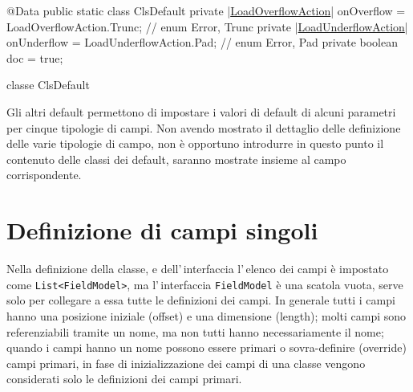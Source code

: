 \documentclass[a4paper,10pt]{report}
\newif\ifesource
\newenvironment{elisting}[1][H]
  {\captionsetup{aboveskip=0pt}\begin{listing}[#1]}
  {\end{listing}%
}
\begin{document}
\ifesource
\begin{figure*}[!htb]
\begin{lstlisting}[language=java, caption=classe ClsDefault, 
label=lst:ClsDefault]
@Data
public static class ClsDefault {
    private (*\hyperref[lst:LoadOverflowAction]{LoadOverflowAction}*) onOverflow = LoadOverflowAction.Trunc;   // enum {Error, Trunc}
    private (*\hyperref[lst:LoadUnderflowAction]{LoadUnderflowAction}*) onUnderflow = LoadUnderflowAction.Pad;  // enum {Error, Pad}
    private boolean doc = true;
}
\end{lstlisting}
\end{figure*}
\else
\begin{elisting}[!htb]
\begin{javacode}
@Data
public static class ClsDefault {
    private |\hyperref[lst:LoadOverflowAction]{LoadOverflowAction}| onOverflow = LoadOverflowAction.Trunc;   // enum {Error, Trunc}
    private |\hyperref[lst:LoadUnderflowAction]{LoadUnderflowAction}| onUnderflow = LoadUnderflowAction.Pad;  // enum {Error, Pad}
    private boolean doc = true;
}
\end{javacode}
\caption{classe ClsDefault}
\label{lst:ClsDefault}
\end{elisting}
\fi

Gli altri default permettono di impostare i valori di default di alcuni 
parametri per cinque tipologie di campi. Non avendo mostrato il dettaglio delle 
definizione delle varie tipologie di campo, non è opportuno introdurre in 
questo punto il contenuto delle classi dei default, saranno mostrate insieme al 
campo corrispondente.

\chapter{Definizione di campi singoli}
Nella definizione della classe, e dell'\,interfaccia l'\,elenco dei campi è
impostato come \verb!List<FieldModel>!, ma l'\,interfaccia \verb!FieldModel! è
una scatola vuota, serve solo per collegare a essa tutte le definizioni dei
campi. In generale tutti i campi hanno una posizione iniziale (offset) e una
dimensione (length); molti campi sono referenziabili tramite un nome, 
ma non tutti hanno necessariamente il nome; quando i campi hanno un nome
possono essere primari o sovra-definire (override) campi primari, in fase di 
inizializzazione dei campi di una classe vengono considerati solo le definizioni
dei campi primari.
\end{document}
